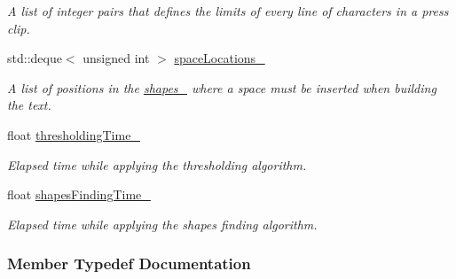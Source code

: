 \begin{CompactItemize}
\begin{CompactList}\small\item\em A list of integer pairs that defines the limits of every line of characters in a press clip. \item\end{CompactList}\item 
\hypertarget{class_segmenter_b6a330577017efe9e49c174c04c4f7c3}{
std::deque$<$ unsigned int $>$ \hyperlink{class_segmenter_b6a330577017efe9e49c174c04c4f7c3}{spaceLocations\_\-}}
\label{class_segmenter_b6a330577017efe9e49c174c04c4f7c3}

\begin{CompactList}\small\item\em A list of positions in the \hyperlink{class_segmenter_41b94ede2829063e0937dc150756e77e}{shapes\_\-} where a space must be inserted when building the text. \item\end{CompactList}\item 
\hypertarget{class_segmenter_1b02328044551876a7b878fc1549bc70}{
float \hyperlink{class_segmenter_1b02328044551876a7b878fc1549bc70}{thresholdingTime\_\-}}
\label{class_segmenter_1b02328044551876a7b878fc1549bc70}

\begin{CompactList}\small\item\em Elapsed time while applying the thresholding algorithm. \item\end{CompactList}\item 
\hypertarget{class_segmenter_e0ade77ddbdc2f6c5eaa1efe372c5a7b}{
float \hyperlink{class_segmenter_e0ade77ddbdc2f6c5eaa1efe372c5a7b}{shapesFindingTime\_\-}}
\label{class_segmenter_e0ade77ddbdc2f6c5eaa1efe372c5a7b}

\begin{CompactList}\small\item\em Elapsed time while applying the shapes finding algorithm. \item\end{CompactList}\end{CompactItemize}


\subsubsection{Member Typedef Documentation}
\hypertarget{class_segmenter_ae134abed2f1d55197820f4027d10999}{
\paragraph[LineMarker]{}\hfill}
\label{class_segmenter_ae134abed2f1d55197820f4027d10999}


